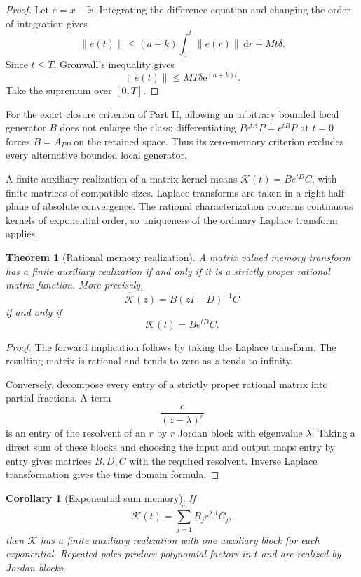 \documentclass[11pt,letterpaper]{article}
\newtheorem{theorem}{Theorem}[section]
\theoremstyle{plain}
\theoremstyle{plain}
\theoremstyle{plain}
\newtheorem{corollary}[corollary]{Corollary}
\theoremstyle{definition}
\theoremstyle{definition}
\theoremstyle{definition}
\theoremstyle{definition}
\theoremstyle{definition}
\theoremstyle{remark}
\theoremstyle{remark}
\theoremstyle{remark}
\theoremstyle{remark}
\theoremstyle{remark}
\newcommand{\norm}[1]{\left\lVert#1\right\rVert}
\theoremstyle{remark}
\newcommand{\Kcal}{\mathcal K}
\newcommand{\e}{\mathrm e}
\newcommand{\dd}{\,\mathrm d}
\let\KomorebiPrimitiveWidehat\widehat
\renewcommand{\widehat}[1]{\KomorebiPrimitiveWidehat{#1}}
\let\KomorebiPrimitiveMathcal\mathcal
\renewcommand{\mathcal}[1]{{\KomorebiPrimitiveMathcal{#1}}}
\let\KomorebiPrimitivemathrm\mathrm
\renewcommand{\mathrm}[1]{{\KomorebiPrimitivemathrm{#1}}}
\begin{document}
\begin{proof}
Let \(e=x-\widetilde x\). Integrating the difference equation and changing the order of integration gives
\[
\norm{e(t)}
\leq
(a+k)\int_0^t\norm{e(r)}\dd r
+Mt\delta.
\]
Since \(t\leq T\), Gronwall's inequality gives
\[
\norm{e(t)}
\leq
MT\delta\e^{(a+k)t}.
\]
Take the supremum over \([0,T]\).
\end{proof}



For the exact closure criterion of Part II, allowing an arbitrary bounded local generator $B$ does not enlarge the class: differentiating $P e^{tA}P=e^{tB}P$ at $t=0$ forces $B=A_{PP}$ on the retained space. Thus its zero-memory criterion excludes every alternative bounded local generator.

A finite auxiliary realization of a matrix kernel means $\Kcal(t)=B e^{tD}C$, with finite matrices of compatible sizes. Laplace transforms are taken in a right half-plane of absolute convergence. The rational characterization concerns continuous kernels of exponential order, so uniqueness of the ordinary Laplace transform applies.
\begin{theorem}[Rational memory realization]\label{earlier:record:022}\label{earlier:thm:rational_memory_realization}
A matrix valued memory transform has a finite auxiliary realization if and only if it is a strictly proper rational matrix function. More precisely,
\[
\boxed{
\widehat\Kcal(z)=B(zI-D)^{-1}C
}
\]
if and only if
\[
\boxed{
\Kcal(t)=B\e^{tD}C.
}
\]
\end{theorem}

\begin{proof}
The forward implication follows by taking the Laplace transform. The resulting matrix is rational and tends to zero as \(z\) tends to infinity.

Conversely, decompose every entry of a strictly proper rational matrix into partial fractions. A term
\[
\frac{c}{(z-\lambda)^r}
\]
is an entry of the resolvent of an \(r\) by \(r\) Jordan block with eigenvalue \(\lambda\). Taking a direct sum of these blocks and choosing the input and output maps entry by entry gives matrices \(B,D,C\) with the required resolvent. Inverse Laplace transformation gives the time domain formula.
\end{proof}

\begin{corollary}[Exponential sum memory]\label{earlier:record:023}\label{earlier:cor:exponential_sum_memory}
If
\[
\Kcal(t)=\sum_{j=1}^{m}B_j\e^{\lambda_jt}C_j,
\]
then \(\Kcal\) has a finite auxiliary realization with one auxiliary block for each exponential. Repeated poles produce polynomial factors in \(t\) and are realized by Jordan blocks.
\end{corollary}
\end{document}
